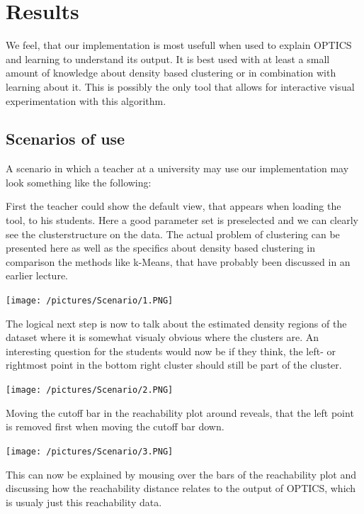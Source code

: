 \documentclass{vgtc}                          %
\begin{document}
\section{Results}

We feel, that our implementation\cite{Our_Implementation} is most usefull when used to explain OPTICS and learning to understand its output. It is best used with at least a small amount of knowledge about density based clustering or in combination with learning about it. This is possibly the only tool that allows for interactive visual experimentation with this algorithm.

\subsection{Scenarios of use}
\begin{flushleft}
A scenario in which a teacher at a university may use our implementation may look something like the following:
\end{flushleft}
\begin{flushleft}
First the teacher could show the default view, that appears when loading the tool, to his students. Here a good parameter set is preselected and we can clearly see the clusterstructure on the data. The actual problem of clustering can be presented here as well as the specifics about density based clustering in comparison the methods like k-Means, that have probably been discussed in an earlier lecture.
\end{flushleft}
\texttt{[image: /pictures/Scenario/1.PNG]}
\begin{flushleft}
The logical next step is now to talk about the estimated density regions of the dataset where it is somewhat visualy obvious where the clusters are. An interesting question for the students would now be if they think, the left- or rightmost point in the bottom right cluster should still be part of the cluster.
\end{flushleft}
\texttt{[image: /pictures/Scenario/2.PNG]}
\begin{flushleft}
Moving the cutoff bar in the reachability plot around reveals, that the left point is removed first when moving the cutoff bar down.
\end{flushleft}
\texttt{[image: /pictures/Scenario/3.PNG]}
\begin{flushleft}
This can now be explained by mousing over the bars of the reachability plot and discussing how the reachability distance relates to the output of OPTICS, which is usualy just this reachability data.
\end{flushleft}
\end{document}
